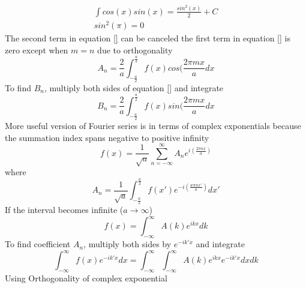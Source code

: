\documentclass[12pt]{article}
\begin{document}
    \begin{gather*}
        \int cos(x) sin(x) = \frac{sin^2(x)}{2}+C
        \\ sin^2(\pi) = 0
    \end{gather*}
    The second term in equation \ref{} can be canceled
    \newline the first term in equation \ref{} is zero except when $m=n$ due to orthogonality
    \begin{equation} \label{eq: 11-11-22}
        A_n = \frac{2}{a} \int_{-\frac{a}{2}}^{\frac{a}{2}}f(x) cos(\frac{2 \pi m x}{a} dx
    \end{equation}
    To find $B_n$, multiply both sides of equation \ref{} and integrate
    \begin{equation} \label{eq: 11-11-23}
        B_n = \frac{2}{a} \int_{-\frac{a}{2}}^{\frac{a}{2}} f(x) sin(\frac{2 \pi m x}{a} dx
    \end{equation}
    More useful version of Fourier series is in terms of complex exponentials because the summation index spans negative to positive infinity
    \begin{equation} \label{eq: 11-11-24}
        f(x) = \frac{1}{\sqrt{a}} \sum_{n=-\infty}^{\infty} A_n e^{i(\frac{2 \pi n x}{a})}
    \end{equation}
    where
    \begin{equation} \label{eq: 11-11-25}
        A_n = \frac{1}{\sqrt{a}} \int_{-\frac{a}{2}}^{\frac{a}{2}} f(x')e^{-i(\frac{w \pi n x'}{a})} dx'
    \end{equation}
    If the interval becomes infinite ($a\rightarrow \infty$)
    \begin{equation} \label{eq: 11-11-26}
        f(x) = \int_{-\infty}^{\infty} A(k) e^{ikx} dk
    \end{equation}
    To find coefficient $A_n$, multiply both sides by $e^{-ik'x}$ and integrate
    \begin{equation} \label{eq: 11-11-27}
        \int_{-\infty}^{\infty} f(x) e^{-ik'x} dx= \int_{-\infty}^{\infty} \int_{-\infty}^{\infty} A(k) e^{ikx} e^{-ik'x} dx dk
    \end{equation}    
    Using Orthogonality of complex exponential
\end{document}
